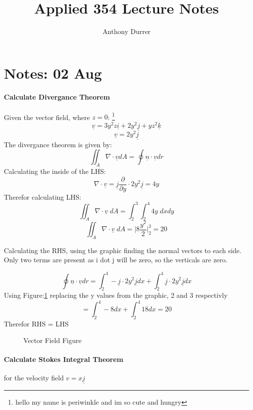 \documentclass[12pt, letterpaper]{article}
\title{Applied 354 Lecture Notes}
\author{Anthony Durrer}
\newcommand{\un}[1]{\underline{#1}}
\newcommand{\partFrac}[2]{\frac{\partial #1}{\partial #2}}
\begin{document}
	\maketitle

	\section{Notes: 02 Aug}
	\paragraph{Calculate Divergance Theorem}
		Given the vector field, where $z=0$:
		\footnote{hello my name is periwinkle and im so cute and hungry}
		\begin{equation}
			\underline{v}=3y^{2}z\underline{i} + 2y^{2}\underline{j} + yz^{2}\underline{k}
		\end{equation}
		\begin{equation}
			\underline{v} = 2y^{2}\underline{j}
		\end{equation}
		The divergance theorem is given by:
		\begin{equation}
			\iint_A \nabla \cdot \underline{v} dA  = \oint \underline{n} \cdot \underline{v} dr
		\end{equation}
		Calculating the inside of the LHS:
		\begin{equation}
			\nabla \cdot \un{v} = \un{j} \partFrac{}{y} \cdot 2y^{2} \un{j} = 4y
		\end{equation}
		Therefor calculating LHS:
		\begin{equation}
			\iint_A \nabla \cdot \underline{v} \; dA  = \int_{2}^{3} \int_2^4 4y \;dxdy
		\end{equation}
		\begin{equation}
			\iint_A \nabla \cdot \underline{v} \; dA  = \Big| 8 \frac{y^2}{2} \Big|_2^3 = 20
		\end{equation}

		Calculating the RHS, using the graphic finding the normal vectors to each side. Only two terms
		are present as i dot j will be zero, so the verticals are zero.

		\begin{equation}
			\oint \underline{n} \cdot \underline{v} dr = \int_2^4 -\un{j} \cdot 2y^2\un{j} dx + \int_2^4 \un{j} \cdot 2y^2\un{j} dx 
		\end{equation}
		Using Figure:\ref{fg:1} replacing the y values from the graphic, 2 and 3 respectivly
		\begin{equation}
			= \int_2^4 -8 dx + \int_2^4 18 dx = 20
		\end{equation}
		Therefor RHS = LHS
		\begin{figure}[h]
			\centering
			\caption{Vector Field Figure}
			\label{fg:1}
		\end{figure}


	\paragraph{Calculate Stokes Integral Theorem} for the velocity field $v=x \un{j}$
\end{document}
